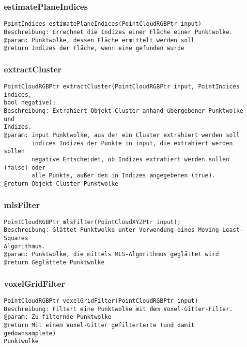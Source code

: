 \documentclass{suturo}
\begin{document}
\subsubsection{estimatePlaneIndices}
\begin{verbatim}
PointIndices estimatePlaneIndices(PointCloudRGBPtr input)
Beschreibung: Errechnet die Indizes einer Fläche einer Punktwolke.
@param: Punktwolke, dessen Fläche ermittelt werden soll
@return Indizes der Fläche, wenn eine gefunden wurde
\end{verbatim}\label{func:estimateplaneindices}

\subsubsection{extractCluster}
\begin{verbatim}
PointCloudRGBPtr extractCluster(PointCloudRGBPtr input, PointIndices indices, 
bool negative);
Beschreibung: Extrahiert Objekt-Cluster anhand übergebener Punktwolke und
Indizes.
@param: input Punktwolke, aus der ein Cluster extrahiert werden soll
		indices Indizes der Punkte in input, die extrahiert werden sollen
		negative Entscheidet, ob Indizes extrahiert werden sollen (false) oder
		alle Punkte, außer den in Indizes angegebenen (true).
@return Objekt-Cluster Punktwolke
\end{verbatim}\label{func:extractcluster}

\subsubsection{mlsFilter}
\begin{verbatim}
PointCloudRGBPtr mlsFilter(PointCloudXYZPtr input);
Beschreibung: Glättet Punktwolke unter Verwendung eines Moving-Least-Squares
Algorithmus.
@param: Punktwolke, die mittels MLS-Algorithmus geglättet wird
@return Geglättete Punktwolke
\end{verbatim}\label{func:mlsfilter}

\subsubsection{voxelGridFilter}
\begin{verbatim}
PointCloudRGBPtr voxelGridFilter(PointCloudRGBPtr input)
Beschreibung: Filtert eine Punktwolke mit dem Voxel-Gitter-Filter.
@param: Zu filternde Punktwolke
@return Mit einem Voxel-Gitter gefilterterte (und damit gedownsamplete)
Punktwolke
\end{verbatim}\label{func:voxelgridfilter}
\end{document}
